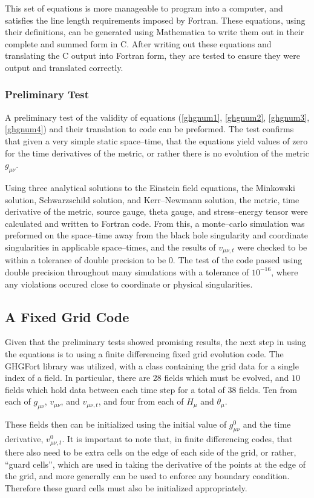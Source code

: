 \documentclass[11pt]{article}
\numberwithin{equation}{section}
\begin{document}
This set of equations is more manageable to program into a computer, and satisfies the line length requirements imposed by Fortran. These equations, using their definitions, can be generated using Mathematica to write them out in their complete and summed form in C. After writing out these equations and translating the C output into Fortran form, they are tested to ensure they were output and translated correctly. 

\subsubsection{Preliminary Test}
A preliminary test of the validity of equations (\ref{ghgnum1}, \ref{ghgnum2}, \ref{ghgnum3}, \ref{ghgnum4}) and their translation to code can be preformed. The test confirms that given a very simple static space--time, that the equations yield values of zero for the time derivatives of the metric, or rather there is no evolution of the metric $g_{\mu\nu}$. 

Using three analytical solutions to the Einstein field equations, the Minkowski solution,  Schwarzschild solution, and Kerr--Newmann solution, the metric, time derivative of the metric, source gauge, theta gauge, and stress--energy tensor were calculated and written to Fortran code. From this, a monte--carlo simulation was preformed on the space--time away from the black hole singularity and coordinate singularities in applicable space--times, and the results of $v_{\mu\nu,t}$ were checked to be within a tolerance of double precision to be $0$. The test of the code passed using double precision throughout many simulations with a tolerance of $10^{-16}$, where any violations occured close to coordinate or physical singularities. 


\subsection{A Fixed Grid Code}
Given that the preliminary tests showed promising results, the next step in using the equations is to using a finite differencing fixed grid evolution code. The GHGFort library was utilized, with a class containing the grid data for a single index of a field. In particular, there are $28$ fields which must be evolved, and $10$ fields which hold data between each time step for a total of $38$ fields. Ten from each of $g_{\mu\nu}$, $v_{\mu\nu}$, and $v_{\mu\nu,t}$, and four from each of $H_{\mu}$ and $\theta_{\mu}$.

These fields then can be initialized using the initial value of $g^0_{\mu\nu}$ and the time derivative, $v^0_{\mu\nu,t}$. It is important to note that, in finite differencing codes, that there also need to be extra cells on the edge of each side of the grid, or rather, ``guard cells'', which are used in taking the derivative of the points at the edge of the grid, and more generally can be used to enforce any boundary condition. Therefore these guard cells must also be initialized appropriately. 
\end{document}
